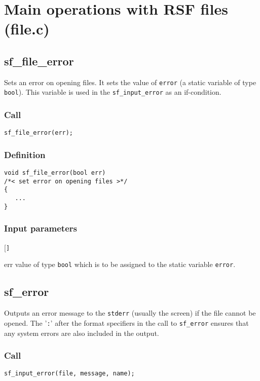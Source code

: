 \section{Main operations with RSF files (file.c)}\label{sec:file.c}




\subsection{{sf\_file\_error}}
Sets an error on opening files. It sets the value of \texttt{error} (a static variable of type \texttt{bool}). This variable is used in the \texttt{sf\_input\_error} as an if-condition.

\subsubsection*{Call}
\begin{verbatim}sf_file_error(err);\end{verbatim}

\subsubsection*{Definition}
\begin{verbatim}
void sf_file_error(bool err)
/*< set error on opening files >*/
{
   ...
}
\end{verbatim}

\subsubsection*{Input parameters}
\begin{desclist}{\tt }{\quad}[\tt ]
   \setlength\itemsep{0pt}
   \item[err] value of type \texttt{bool} which is to be assigned to the static variable \texttt{error}.
\end{desclist}




\subsection{{sf\_error}}
Outputs an error message to the \texttt{stderr} (usually the screen) if the file cannot be opened. The '\texttt{:}' after the format specifiers in the call to \texttt{sf\_error} ensures that any system errors are also included in the output. 

\subsubsection*{Call}
\begin{verbatim}sf_input_error(file, message, name);\end{verbatim}

